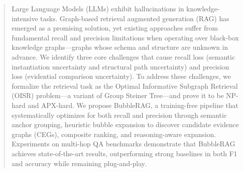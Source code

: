 \documentclass[sigconf, nonacm]{acmart}
\begin{document}
\begin{abstract}
Large Language Models (LLMs) exhibit hallucinations in knowledge-intensive tasks. Graph-based retrieval augmented generation (RAG) has emerged as a promising solution, yet existing approaches suffer from fundamental recall and precision limitations when operating over black-box knowledge graphs---graphs whose schema and structure are unknown in advance. We identify three core challenges that cause recall loss (semantic instantiation uncertainty and structural path uncertainty) and precision loss (evidential comparison uncertainty). To address these challenges, we formalize the retrieval task as the Optimal Informative Subgraph Retrieval (OISR) problem---a variant of Group Steiner Tree---and prove it to be NP-hard and APX-hard. We propose BubbleRAG, a training-free pipeline that systematically optimizes for both recall and precision through semantic anchor grouping, heuristic bubble expansion to discover candidate evidence graphs (CEGs), composite ranking, and reasoning-aware expansion. Experiments on multi-hop QA benchmarks demonstrate that BubbleRAG achieves state-of-the-art results, outperforming strong baselines in both F1 and accuracy while remaining plug-and-play.
\end{abstract}







\maketitle

% 

% 

% 

% 

% 

% 

% 






\balance


\end{document}
